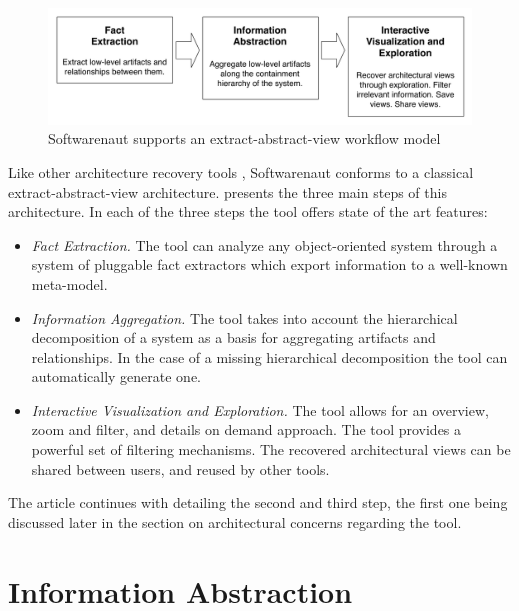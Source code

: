 \documentclass[preprint,12pt]{elsarticle}
\begin{document}
\begin{figure}[h]
\begin{center}
\includegraphics[width=\linewidth]{SnautWorkflow}
\caption{Softwarenaut supports an extract-abstract-view workflow model}
\end{center}
\end{figure}

Like other architecture recovery tools \cite{pollet-sar}, Softwarenaut conforms to a classical extract-abstract-view architecture.  presents the three main steps of this architecture. In each of the three steps the tool offers state of the art features:

\begin{itemize}
\item {\em Fact Extraction.} The tool can analyze any object-oriented system through a system of pluggable fact extractors which export information to a well-known meta-model. 
\item {\em Information Aggregation.} The tool takes into account the hierarchical decomposition of a system as a basis for aggregating artifacts and relationships. In the case of a missing hierarchical decomposition the tool can automatically generate one.
\item {\em Interactive Visualization and Exploration.} The tool allows for an overview, zoom and filter, and details on demand approach. The tool provides a powerful set of filtering mechanisms. The recovered architectural views can be shared between users, and reused by other tools.
\end{itemize}

The article continues with detailing the second and third step, the first one being discussed later in the section on architectural concerns regarding the tool.



\section {Information Abstraction} \label{sec:org}
\end{document}
